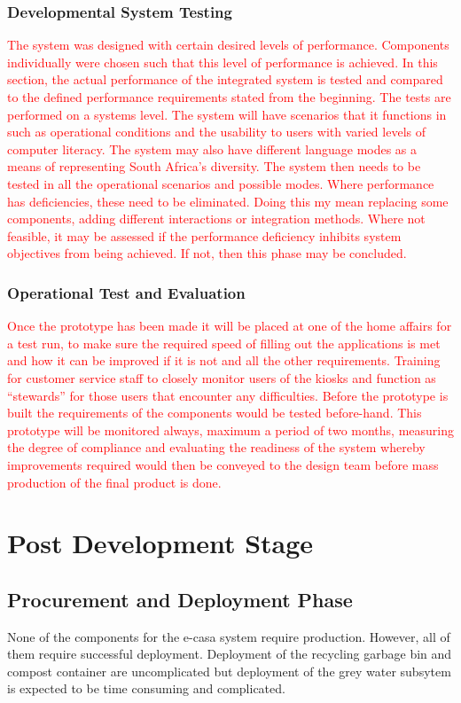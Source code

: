 \documentclass[a4paper,11pt,fleqn]{report}
\begin{document}
\subsection{Developmental System Testing}
\textcolor{red}{The system was designed with certain desired levels of performance. Components individually were chosen such that this level of performance is achieved. In this section, the actual performance of the integrated system is tested and compared to the defined performance requirements stated from the beginning. The tests are performed on a systems level. The system will have scenarios that it functions in such as operational conditions and the usability to users with varied levels of computer literacy. The system may also have different language modes as a means of representing South Africa’s diversity. The system then needs to be tested in all the operational scenarios and possible modes. Where performance has deficiencies, these need to be eliminated. Doing this my mean replacing some components, adding different interactions or integration methods. Where not feasible, it may be assessed if the performance deficiency inhibits system objectives from being achieved. If not, then this phase may be concluded.}

\subsection{Operational Test and Evaluation}
\textcolor{red}{Once the prototype has been made it will be placed at one of the home affairs for a test run, to make sure the required speed of filling out the applications is met and how it can be improved if it is not and all the other requirements. Training for customer service staff to closely monitor users of the kiosks and function as “stewards” for those users that encounter any difficulties. Before the prototype is built the requirements of the components would be tested before-hand. This prototype will be monitored always, maximum a period of two months, measuring the degree of compliance and evaluating the readiness of the system whereby improvements required would then be conveyed to the design team before mass production of the final product is done.}

\chapter{Post Development Stage}

\section{Procurement and Deployment Phase}
None of the components for the \ac{e-casa} system require production. However, all of them require successful deployment. Deployment of the recycling garbage bin and compost container are uncomplicated but deployment of the grey water subsytem is expected to be time consuming and complicated. 
\end{document}

